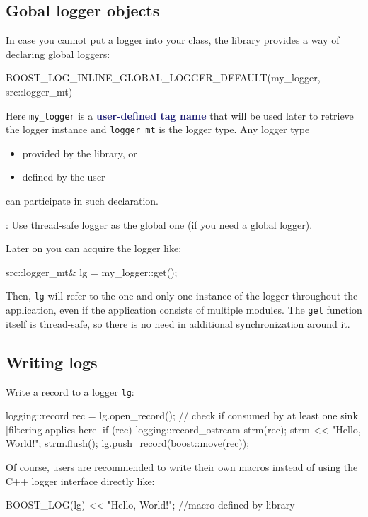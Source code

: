 \documentclass[dvipsnames]{article}
\newcommand{\mycola}{MidnightBlue}
\newcommand{\Cola}[1]{\textcolor{\mycola}{\textbf{#1}}}
\begin{document}
\subsection{Gobal logger objects}

In case you cannot put a logger into your class, the library provides a way of
declaring global loggers:
\begin{simplec}
  BOOST_LOG_INLINE_GLOBAL_LOGGER_DEFAULT(my_logger, src::logger_mt)
\end{simplec}
Here \verb|my_logger| is a \Cola{user-defined tag name }
that will be used later to
retrieve the logger instance and \verb|logger_mt| is the logger type. Any logger
type
\begin{itemize}
\item provided by the library, or
\item defined by the user
\end{itemize}
can participate in such declaration.
\begin{tcolorbox}
   : Use thread-safe logger as the global one (if you need a
  global logger).
\end{tcolorbox}
Later on you can acquire the logger like:
\begin{simplec}
  src::logger_mt& lg = my_logger::get();
\end{simplec}
Then, \texttt{lg} will refer to the one and only one instance of the logger
throughout the application, even if the application consists of multiple
modules. The \texttt{get} function itself is thread-safe, so there is no need in
additional synchronization around it.

\subsection{Writing logs}

Write a record to a logger \texttt{lg}:
\begin{simplec}
  logging::record rec = lg.open_record(); // check if consumed by at least one sink [filtering applies here]
  if (rec){
    logging::record_ostream strm(rec);
    strm << "Hello, World!";
    strm.flush();
    lg.push_record(boost::move(rec));
  }
\end{simplec}

Of course, users are recommended to write their own macros instead of using the
C++ logger interface directly like:
\begin{simplec}
  BOOST_LOG(lg) << "Hello, World!"; //macro defined by library
\end{simplec}
\end{document}
